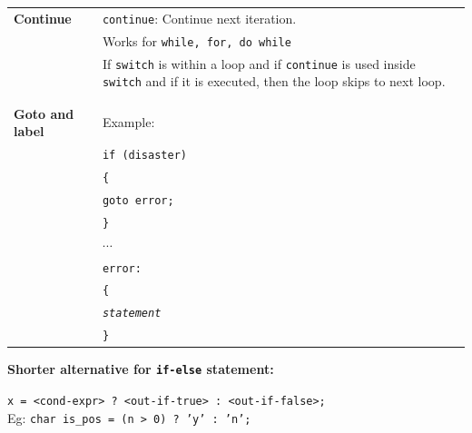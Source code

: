 \begin{minipage}{\linewidth}
\begin{tabularx}{\linewidth}{l|X}

    \textbf{Continue} & \texttt{continue}: Continue next iteration.\\
    & Works for \texttt{while, for, do while}\\
    & If \texttt{switch} is within a loop and if \texttt{continue} is used inside \texttt{switch} and if it is executed, then the loop skips to next loop.\\
    \hline\\

    \hline\\
    \textbf{Goto and label} & Example:\\
    & \texttt{if (disaster)}\\
    & \texttt{\{}\\
    & \texttt{\qquad goto error;}\\
    & \texttt{\}}\\
    & $\cdots$\\
    & \texttt{error:}\\
    & \texttt{\{}\\
    & \texttt{\qquad \textit{statement}}\\
    & \texttt{\}}\\
    \hline
\end{tabularx}

\begin{mdframed}[backgroundcolor=blue!20]
    \textbf{Shorter alternative for \texttt{if-else} statement:}

    \texttt{x = <cond-expr> ? <out-if-true> : <out-if-false>;}\\
    Eg: \texttt{char is\_pos = (n > 0) ? 'y' : 'n';}\\
\end{mdframed}

\end{minipage}
